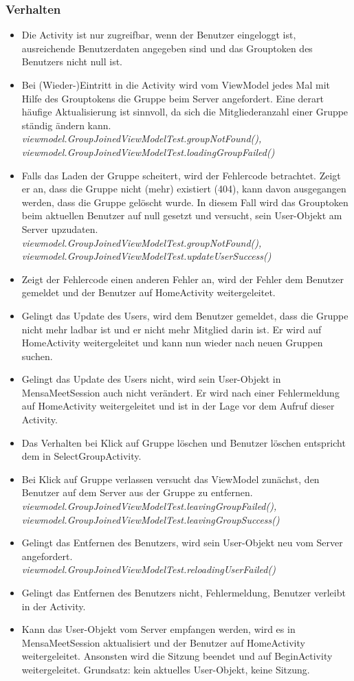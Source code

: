 \documentclass[a4paper]{scrreprt}
\begin{document}
\subsubsection{Verhalten}
\begin{itemize}
\item Die Activity ist nur zugreifbar, wenn der Benutzer eingeloggt ist, ausreichende Benutzerdaten angegeben sind und das Grouptoken des Benutzers nicht null ist.
\item Bei (Wieder-)Eintritt in die Activity wird vom ViewModel jedes Mal mit Hilfe des Grouptokens die Gruppe beim Server angefordert. Eine derart häufige Aktualisierung ist sinnvoll, da sich die Mitgliederanzahl einer Gruppe ständig ändern kann. \\
\textit{viewmodel.GroupJoinedViewModelTest.groupNotFound(),
viewmodel.GroupJoinedViewModelTest.loadingGroupFailed()}
\item Falls das Laden der Gruppe scheitert, wird der Fehlercode betrachtet. Zeigt er an, dass die Gruppe nicht (mehr) existiert (404), kann davon ausgegangen werden, dass die Gruppe gelöscht wurde. In diesem Fall wird das Grouptoken beim aktuellen Benutzer auf null gesetzt und versucht, sein User-Objekt am Server upzudaten.\\
\textit{viewmodel.GroupJoinedViewModelTest.groupNotFound(),
viewmodel.GroupJoinedViewModelTest.updateUserSuccess()}
\item Zeigt der Fehlercode einen anderen Fehler an, wird der Fehler dem Benutzer gemeldet und der Benutzer auf HomeActivity weitergeleitet. 
\item Gelingt das Update des Users, wird dem Benutzer gemeldet, dass die Gruppe nicht mehr ladbar ist und er nicht mehr Mitglied darin ist. Er wird auf HomeActivity weitergeleitet und kann nun wieder nach neuen Gruppen suchen.
\item Gelingt das Update des Users nicht, wird sein User-Objekt in MensaMeetSession auch nicht verändert. Er wird nach einer Fehlermeldung auf HomeActivity weitergeleitet und ist in der Lage vor dem Aufruf dieser Activity. 
\item Das Verhalten bei Klick auf Gruppe löschen und Benutzer löschen entspricht dem in SelectGroupActivity.
\item Bei Klick auf Gruppe verlassen versucht das ViewModel zunächst, den Benutzer auf dem Server aus der Gruppe zu entfernen. \\
\textit{viewmodel.GroupJoinedViewModelTest.leavingGroupFailed(),
viewmodel.GroupJoinedViewModelTest.leavingGroupSuccess()}
\item Gelingt das Entfernen des Benutzers, wird sein User-Objekt neu vom Server angefordert.\\
\textit{viewmodel.GroupJoinedViewModelTest.reloadingUserFailed()}
\item Gelingt das Entfernen des Benutzers nicht, Fehlermeldung, Benutzer verleibt in der Activity. 
\item Kann das User-Objekt vom Server empfangen werden, wird es in MensaMeetSession aktualisiert und der Benutzer auf HomeActivity weitergeleitet. Ansonsten wird die Sitzung beendet und auf BeginActivity weitergeleitet. Grundsatz: kein aktuelles User-Objekt, keine Sitzung.


\end{itemize}
\end{document}
